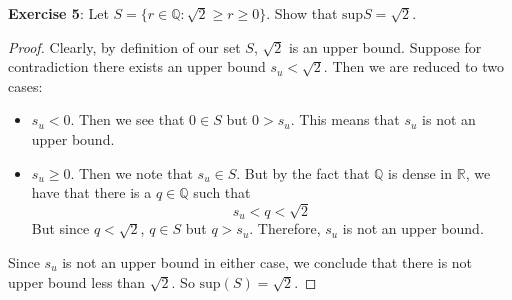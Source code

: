 \documentclass{article}
\begin{document}
\textbf{Exercise 5}: Let $S = \{r \in \mathbb{Q} : \sqrt{2} \geq r \geq 0\}$. Show that $\text{sup}S = \sqrt{2}$.
    \begin{proof}
        Clearly, by definition of our set $S$, $\sqrt{2}$ is an upper bound. Suppose for contradiction there exists an upper bound $s_{u} < \sqrt{2}$. Then we are reduced to two cases:
            \begin{itemize}
                \item $s_{u} < 0$. Then we see that $0 \in S$ but $0 > s_{u}$. This means that $s_{u}$ is not an upper bound.

                \item $s_{u} \geq 0$. Then we note that $s_{u} \in S$. But by the fact that $\mathbb{Q}$ is dense in $\mathbb{R}$, we have that there is a $q \in \mathbb{Q}$ such that
                    \begin{equation*}
                        s_{u} <  q < \sqrt{2}
                    \end{equation*}
                But since $q < \sqrt{2}$, $q \in S$ but $q > s_{u}$. Therefore, $s_{u}$ is not an upper bound.
            \end{itemize}
        Since $s_{u}$ is not an upper bound in either case, we conclude that there is not upper bound less than $\sqrt{2}$. So $\text{sup}(S) = \sqrt{2}$.
    \end{proof}
\end{document}
